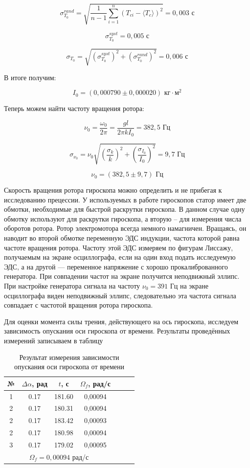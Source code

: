 \documentclass[12pt]{article}
\begin{document}
$$\sigma_{T_0}^{rand} = \sqrt{\frac{1}{n - 1} \sum_{i = 1}^{n} ({T_{ci} - \langle T_c \rangle})^2 } = 0,003 \text{ с}$$

$$\sigma_{T_0}^{syst} = 0,005 \text{ с}$$

$$\sigma_{T_0} = \sqrt{(\sigma_{T_0}^{syst})^2 + (\sigma_{T_0}^{rand})^2 } = 0,006 \text{ с}$$

В итоге получим:

$$I_0 = (0,000790 \pm 0,000020) \text{ кг} \cdot \text{м}^2$$

Теперь можем найти частоту вращения ротора:

$$\nu_0 = \frac{\omega_0}{2\pi} = \frac{gl}{2\pi k I_0} = 382,5 \text{ Гц}$$

$$\sigma_{\nu_0} = \nu_0 \sqrt{(\frac{\sigma_k}{k})^2 + (\frac{\sigma_{I_0}}{I_0})^2} = 9,7 \text{ Гц}$$

$$\nu_0 = (382,5 \pm  9,7) \text{ Гц}$$

Скорость вращения ротора гироскопа можно определить и не прибегая к исследованию прецессии. У используемых в работе гироскопов статор имеет две обмотки, необходимые для быстрой раскрутки гироскопа. В данном случае одну обмотку используют для раскрутки гироскопа, а вторую -- для измерения числа оборотов ротора. Ротор электромотора всегда немного намагничен. Вращаясь, он наводит во второй обмотке переменную ЭДС индукции, частота которой равна частоте вращения ротора. Частоту этой ЭДС измеряем по фигурам Лиссажу, получаемым на экране осциллографа, если на один вход подать исследуемую ЭДС, а на другой — переменное напряжение с хорошо прокалиброванного генератора. При совпадении частот на экране получится неподвижный эллипс.\\
При настройке генератора сигнала на частоту $ \nu_0 = 391$ Гц на экране осциллографа виден  неподвижный эллипс, следовательно эта частота сигнала совпадает с частотой вращения ротора гироскопа.

Для оценки момента силы трения, действующего на ось гироскопа, исследуем зависимость опускания оси гироскопа от времени. Результаты проведённых измерений записываем в таблицу

\begin{table}[h!]
\centering
\begin{tabular}{|c|c|c|c|c|c|c|}
\hline
№ & $ \Delta \alpha $, рад & $ t $, с & $ \Omega_{f} $, рад/с \\ \hline
1 & 0.17 & 181.60 & 0,00094 \\ \hline%
2 & 0.17 & 180.31 & 0,00094 \\ \hline%
2 & 0.17 & 183.42 & 0,00093 \\ \hline%
2 & 0.17 & 180.98 & 0,00094 \\ \hline%
3 & 0.17 & 179.02 & 0,00095 \\ \hline
\multicolumn{4}{|c|}{$\Omega_{f} = 0,00094$ рад/с} \\ \hline
\end{tabular}
\caption{Результат измерения зависимости опускания оси гироскопа от времени}
\label{tab:my-table}
\end{table}
\end{document}
